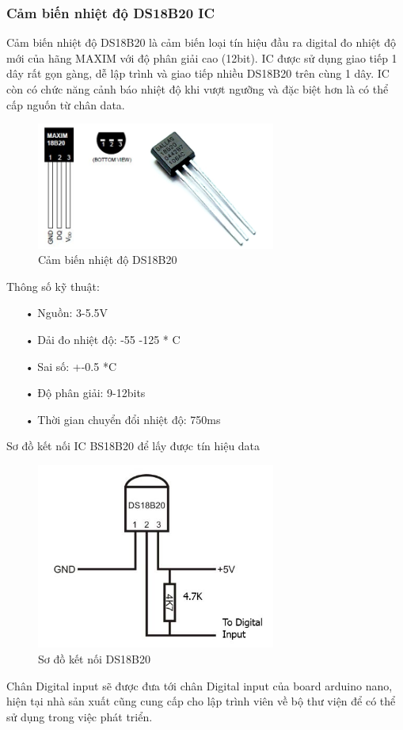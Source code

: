 \subsubsection*{Cảm biến nhiệt độ DS18B20 IC} 
Cảm biến nhiệt độ DS18B20 là cảm biến loại tín hiệu đầu ra digital đo nhiệt độ mới của hãng MAXIM với độ phân giải cao (12bit). IC được sử dụng giao tiếp 1 dây rất gọn gàng, dễ lập trình và giao tiếp nhiều DS18B20 trên cùng 1 dây. IC còn có chức năng cảnh báo nhiệt độ khi vượt ngưỡng và đặc biệt hơn là có thể cấp nguốn từ chân data.

\begin{figure}[H]
	\centering    
	\includegraphics[width=0.7\textwidth]{ds18b20}
	\caption[Cảm biến nhiệt độ DS18B20]{Cảm biến nhiệt độ DS18B20}
	\label{fig:ds18b20}
\end{figure}

Thông số kỹ thuật:
\begin{itemize}
\item[•]Nguồn: 3-5.5V
\item[•]Dải đo nhiệt độ: -55 -125 * C
\item[•]Sai số: +-0.5 *C
\item[•]Độ phân giải: 9-12bits
\item[•]Thời gian chuyển đổi nhiệt độ: 750ms
\end{itemize}
Sơ đồ kết nối IC BS18B20 để lấy được tín hiệu data
\begin{figure}[H]
	\centering    
	\includegraphics[width=0.7\textwidth]{ds18b20_ketnoi}
	\caption[Sơ đồ kết nối DS18B20]{Sơ đồ kết nối DS18B20}
	\label{fig: ds18b20_ketnoi}
\end{figure}
Chân Digital input sẽ được đưa tới chân Digital input của board arduino nano, hiện tại nhà sản xuất cũng cung cấp cho lập trình viên về bộ thư viện để có thể sử dụng trong việc phát triển.

